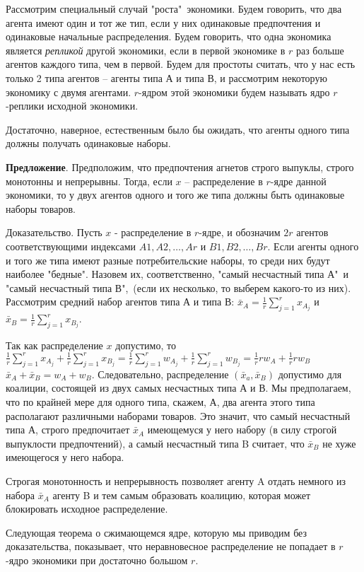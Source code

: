 Рассмотрим специальный случай "роста"\, экономики. Будем говорить, что два агента
имеют один и тот же тип, если у них одинаковые предпочтения и одинаковые начальные
распределения. Будем говорить, что одна экономика является \emph{репликой} другой экономики, если в первой
экономике  в $r$ раз больше агентов каждого типа, чем в первой. Будем для простоты
считать, что у нас есть только 2 типа агентов -- агенты типа А и типа В, и рассмотрим
некоторую экономику с двумя агентами. $r$-ядром этой экономики будем
называть ядро $r$-реплики исходной экономики.

Достаточно, наверное, естественным было бы ожидать, что агенты одного типа должны
получать одинаковые наборы.

{\bf Предложение}. Предположим, что предпочтения агнетов строго выпуклы, строго монотонны и
непрерывны. Тогда, если $x$ -- распределение в $r$-ядре данной экономики, то
у двух агентов одного и того же типа должны быть одинаковые наборы товаров.

Доказательство. Пусть $x$ - распределение в $r$-ядре, и обозначим
$2r$ агентов соответствующими индексами $A1,A2,\ldots,Ar$  и
$B1,B2,\ldots,Br$. Если агенты одного и того же типа имеют
разные потребительские наборы, то среди них будут наиболее "бедные".
Назовем их, соответственно, "самый несчастный типа А"\, и "самый
несчастный типа В",\, (если их несколько, то выберем какого-то из них).
Рассмотрим средний набор агентов типа А и типа В: $\bar
x_A={\frac{1}{r}}\sum^r_{j=1}x_{A_j}$ и $\bar
x_B={\frac{1}{r}}\sum^r_{j=1}x_{B_j}$.

Так как распределение $x$ допустимо, то
${\frac{1}{r}}\sum^r_{j=1}x_{A_j}+{\frac{1}{r}}\sum^r_{j=1}x_{B_j}=
{\frac{1}{r}}\sum^r_{j=1}w_{A_j}+{\frac{1}{r}}\sum^r_{j=1}w_{B_j}=
{\frac{1}{r}}rw_A+{\frac{1}{r}}rw_B$ $\bar x_A+\bar x_B=w_A+w_B.$
Следовательно, распределение
$(\bar x_a,\bar x_B)$ допустимо для коалиции, состоящей из двух самых
несчастных типа А и В.
Мы предполагаем, что по крайней мере для одного типа, скажем, А, два агента этого типа
располагают различными наборами товаров. Это значит, что самый несчастный типа А, строго
предпочитает $\bar x_A$ имеющемуся у него набору (в силу строгой выпуклости предпочтений),
а самый несчастный типа B считает, что $\bar x_B$ не хуже имеющегося у него набора.

Строгая монотонность и непрерывность позволяет агенту A отдать немного из набора
$\bar x_A$ агенту B и тем самым образовать коалицию, которая может блокировать
исходное распределение.

Следующая теорема о сжимающемся ядре, которую мы приводим без доказательства,
показывает, что неравновесное распределение
не попадает в $r$-ядро экономики при достаточно большом $r$.

